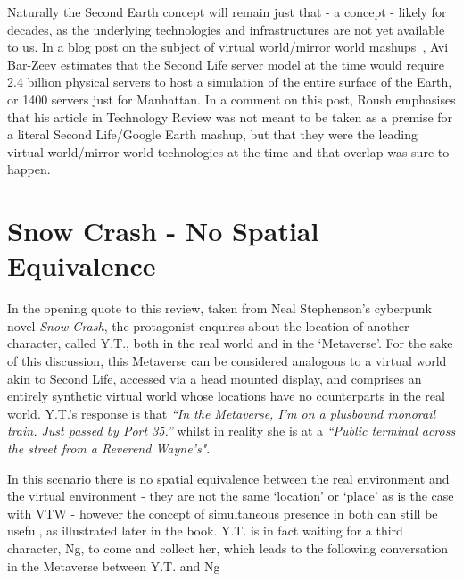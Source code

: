 Naturally the Second Earth concept will remain just that - a concept - likely for decades, as the underlying technologies and infrastructures are not yet available to us. In a blog post on the subject of virtual world/mirror world mashups~\cite{Bar-Zeev2007}, Avi Bar-Zeev estimates that the Second Life server model at the time would require 2.4 billion physical servers to host a simulation of the entire surface of the Earth, or 1400 servers just for Manhattan. In a comment on this post, Roush emphasises that his article in Technology Review was not meant to be taken as a premise for a literal Second Life/Google Earth mashup, but that they were the leading virtual world/mirror world technologies at the time and that overlap was sure to happen.

\section{Snow Crash - No Spatial Equivalence}
In the opening quote to this review, taken from Neal Stephenson's cyberpunk novel \textit{Snow Crash}, the protagonist enquires about the location of another character, called Y.T., both in the real world and in the `Metaverse'. For the sake of this discussion, this Metaverse can be considered analogous to a virtual world akin to Second Life, accessed via a head mounted display, and comprises an entirely synthetic virtual world whose locations have no counterparts in the real world. Y.T.'s response is that \textit{``In  the Metaverse, I'm on a plusbound monorail train. Just passed by Port 35.''} whilst in reality she is at a \textit{``Public terminal across the street from a Reverend Wayne's"}.

In this scenario there is no spatial equivalence between the real environment and the virtual environment - they are not the same `location' or `place' as is the case with VTW - however the concept of simultaneous presence in both can still be useful, as illustrated later in the book. Y.T. is in fact waiting for a third character, Ng, to come and collect her, which leads to the following conversation in the Metaverse between Y.T. and Ng

